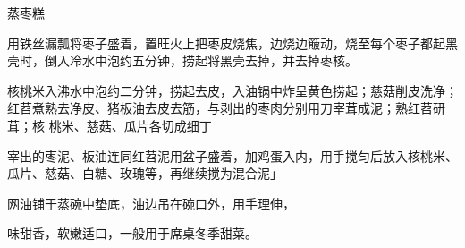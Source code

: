 \begin{recipe}{蒸枣糕}

\ingredients


\preparation

\step 用铁丝漏瓢将枣子盛着，置旺火上把枣皮烧焦，边烧边簸动，烧至每个枣子都起黑
壳时，倒入冷水中泡约五分钟，捞起将黑壳去掉，并去掉枣核。

\step 核桃米入沸水中泡约二分钟，捞起去皮，入油锅中炸呈黄色捞起；慈菇削皮洗净；
红苕煮熟去净皮、猪板油去皮去筋，与剥出的枣肉分别用刀宰茸成泥；熟红苕研茸；核
桃米、慈菇、瓜片各切成细丁

\step 宰出的枣泥、板油连同红苕泥用盆子盛着，加鸡蛋入内，用手搅匀后放入核桃米、
瓜片、慈菇、白糖、玫瑰等，再继续搅为混合泥」

\step 网油铺于蒸碗中垫底，油边吊在碗口外，用手理伸，

\features

味甜香，软嫩适口，一般用于席桌冬季甜菜。

\end{recipe}

